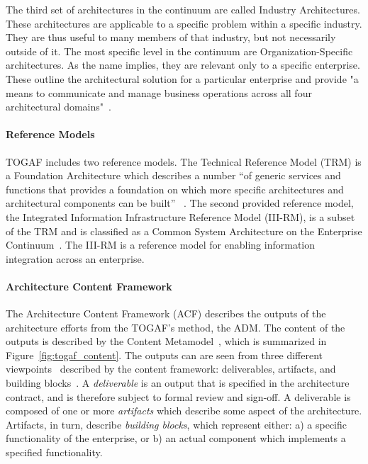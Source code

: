 The third set of architectures in the continuum are called Industry Architectures. These architectures are applicable to a specific problem within a specific industry. They are thus useful to many members of that industry, but not necessarily outside of it. The most specific level in the continuum are Organization-Specific  architectures. As the name implies, they are relevant only to a specific enterprise. These outline the architectural solution for a particular enterprise and provide "a means to communicate and manage business operations across all four architectural domains"~\cite[Ch. 39.4.1]{togaf9.1}.

\paragraph*{Reference Models}
TOGAF includes two reference models. The Technical Reference Model (TRM) is a Foundation Architecture which describes a number ``of generic services and functions that provides a foundation on which more specific architectures and architectural components can be built'' ~\cite[Sec. 43.1.1]{togaf9.1}. The second provided reference model, the Integrated Information Infrastructure Reference Model (III-RM), is a subset of the TRM and is classified as a Common System Architecture on the Enterprise Continuum~\cite[Ch. 44]{togaf9.1}. The III-RM is a reference model for enabling information integration across an enterprise. 



\paragraph*{Architecture Content Framework}
The Architecture Content Framework (ACF) describes the outputs of the architecture efforts from the TOGAF's method, the ADM. The content of the outputs is described by the Content Metamodel~\cite[Ch. 34]{togaf9.1}, which is summarized in Figure~\ref{fig:togaf_content}. The outputs can are seen from three different viewpoints~\cite[Ch. 4]{Bente2012} described by the content framework: deliverables, artifacts, and building blocks~\cite[Ch. 33]{togaf9.1}. A \textit{deliverable} is an output that is specified in the architecture contract, and is therefore subject to formal review and sign-off. A deliverable is composed of one or more \textit{artifacts} which describe some aspect of the architecture. Artifacts, in turn, describe \textit{building blocks}, which represent either: a) a specific functionality of the enterprise, or b) an actual component which implements a specified functionality.

